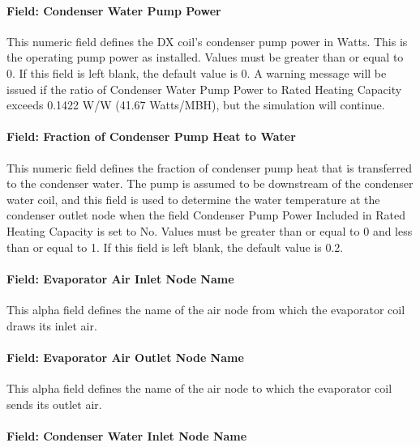 \paragraph{Field: Condenser Water Pump Power}\label{field-condenser-water-pump-power}

This numeric field defines the DX coil's condenser pump power in Watts. This is the operating pump power as installed. Values must be greater than or equal to 0. If this field is left blank, the default value is 0. A warning message will be issued if the ratio of Condenser Water Pump Power to Rated Heating Capacity exceeds 0.1422 W/W (41.67 Watts/MBH), but the simulation will continue.

\paragraph{Field: Fraction of Condenser Pump Heat to Water}\label{field-fraction-of-condenser-pump-heat-to-water}

This numeric field defines the fraction of condenser pump heat that is transferred to the condenser water. The pump is assumed to be downstream of the condenser water coil, and this field is used to determine the water temperature at the condenser outlet node when the field Condenser Pump Power Included in Rated Heating Capacity is set to No. Values must be greater than or equal to 0 and less than or equal to 1. If this field is left blank, the default value is 0.2.

\paragraph{Field: Evaporator Air Inlet Node Name}\label{field-evaporator-air-inlet-node-name-1}

This alpha field defines the name of the air node from which the evaporator coil draws its inlet air.

\paragraph{Field: Evaporator Air Outlet Node Name}\label{field-evaporator-air-outlet-node-name}

This alpha field defines the name of the air node to which the evaporator coil sends its outlet air.

\paragraph{Field: Condenser Water Inlet Node Name}\label{field-condenser-water-inlet-node-name}


